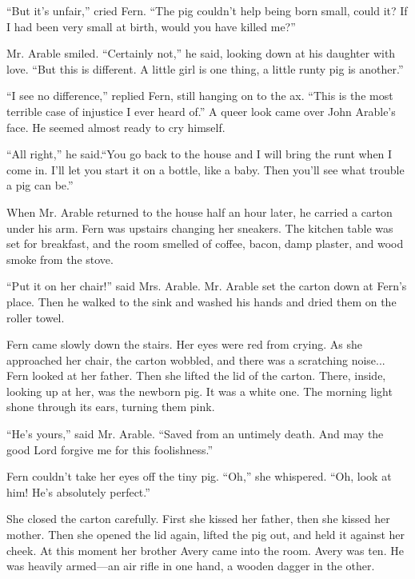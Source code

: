 \documentclass[a4paper, oneside]{book}
\begin{document}
 ``But it's unfair,'' cried Fern. ``The pig couldn't help being born
small, could it? If I had been very small at birth, would you have
killed me?'' 

Mr. Arable smiled. ``Certainly not,'' he said, looking down at his
daughter with love. ``But this is different. A little girl is one thing, a
little runty pig is another.''

 ``I see no difference,'' replied Fern, still hanging on to the ax. ``This
is the most terrible case of injustice I ever heard of.''
 A queer look came over John Arable's face. He seemed almost
ready to cry himself. 

 ``All right,'' he said.``You go back to the house and I will bring the
runt when I come in. I'll let you start it on a bottle, like a baby.
Then you'll see what trouble a pig can be.''

 When Mr. Arable returned to the house half an hour later, he
carried a carton under his arm. Fern was upstairs changing her                 
sneakers. The kitchen table was set for breakfast, and the room
smelled of coffee, bacon, damp plaster, and wood smoke from the
stove. 

 ``Put it on her chair!'' said Mrs. Arable. Mr. Arable set the carton
down at Fern's place. Then he walked to the sink and washed his
hands and dried them on the roller towel.

 Fern came slowly down the stairs. Her eyes were red from crying.
As she approached her chair, the carton wobbled, and there was a
scratching noise... Fern looked at her father. Then she lifted the lid
of the carton. There, inside, looking up at her, was the newborn pig.
It was a white one. The morning light shone through its ears,
turning them pink. 

 ``He's yours,'' said Mr. Arable. ``Saved from an untimely death.
And may the good Lord forgive me for this foolishness.''

 Fern couldn't take her eyes off the tiny pig. ``Oh,'' she whispered.
``Oh, look at him! He's absolutely perfect.'' 

She closed the carton carefully. First she kissed her father, then               
she kissed her mother. Then she opened the lid again, lifted the pig
out, and held it against her cheek. At this moment her brother
Avery came into the room. Avery was ten. He was heavily
armed---an air rifle in one hand, a wooden dagger in the other. 
\end{document}
